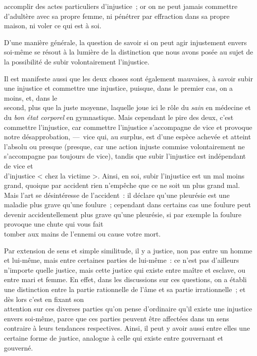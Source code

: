 \documentclass[french,twoside]{book} %
\begin{document}
accomplir des actes particuliers d’injustice ; or on ne peut jamais commettre d’adultère avec sa propre femme, ni pénétrer par effraction dans sa propre maison, ni voler ce qui est à soi.\par
D’une manière générale, la question de savoir si on peut agir injustement envers soi-même se résout à la lumière de la distinction que nous avons posée au sujet de la possibilité de subir volontairement l’injustice.\par
Il est manifeste aussi que les deux choses sont également mauvaises, à savoir subir une injustice et commettre une injustice, puisque, dans le premier cas, on a moins, et, dans le \\
second, plus que la juste moyenne, laquelle joue ici le rôle du {\itshape sain} en médecine et du {\itshape bon état corporel} en gymnastique. Mais cependant le pire des deux, c’est commettre l’injustice, car commettre l’injustice s’accompagne de vice et provoque notre désapprobation, — vice qui, au surplus, est d’une espèce achevée et atteint l’absolu ou presque (presque, car une action injuste commise volontairement ne s’accompagne pas toujours de vice), tandis que subir l’injustice est indépendant de vice et \\
d’injustice < chez la victime >. Ainsi, en soi, subir l’injustice est  un mal moins grand, quoique par accident rien n’empêche que ce ne soit un plus grand mal. Mais l’art se désintéresse de l’accident : il déclare qu’une pleurésie est une maladie plus grave qu’une foulure ; cependant dans certains cas une foulure peut devenir accidentellement plus grave qu’une pleurésie, si par exemple la foulure provoque une chute qui vous fait \\
tomber aux mains de l’ennemi ou cause votre mort.\par
Par extension de sens et simple similitude, il y a justice, non pas entre un homme et lui-même, mais entre certaines parties de lui-même : ce n’est pas d’ailleurs n’importe quelle justice, mais cette justice qui existe entre maître et esclave, ou entre mari et femme. En effet, dans les discussions sur ces questions, on a établi une distinction entre la partie rationnelle de l’âme et sa partie irrationnelle ; et dès lors c’est en fixant son \\
attention sur ces diverses parties qu’on pense d’ordinaire qu’il existe une injustice envers soi-même, parce que ces parties peuvent être affectées dans un sens contraire à leurs tendances respectives. Ainsi, il peut y avoir aussi entre elles une certaine forme de justice, analogue à celle qui existe entre gouvernant et gouverné.
\end{document}
